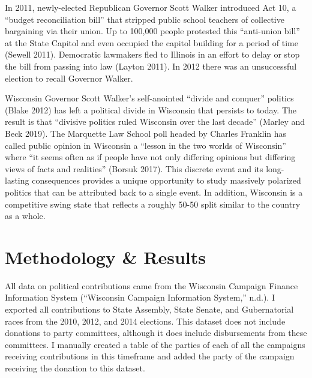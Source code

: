 \documentclass[12pt,]{article}
\begin{document}
In 2011, newly-elected Republican Governor Scott Walker introduced Act
10, a ``budget reconciliation bill'' that stripped public school
teachers of collective bargaining via their union. Up to 100,000 people
protested this ``anti-union bill'' at the State Capitol and even
occupied the capitol building for a period of time (Sewell 2011).
Democratic lawmakers fled to Illinois in an effort to delay or stop the
bill from passing into law (Layton 2011). In 2012 there was an
unsuccessful election to recall Governor Walker.

Wisconsin Governor Scott Walker's self-anointed ``divide and conquer''
politics (Blake 2012) has left a political divide in Wisconsin that
persists to today. The result is that ``divisive politics ruled
Wisconsin over the last decade'' (Marley and Beck 2019). The Marquette
Law School poll headed by Charles Franklin has called public opinion in
Wisconsin a ``lesson in the two worlds of Wisconsin'' where ``it seems
often as if people have not only differing opinions but differing views
of facts and realities'' (Borsuk 2017). This discrete event and its
long-lasting consequences provides a unique opportunity to study
massively polarized politics that can be attributed back to a single
event. In addition, Wisconsin is a competitive swing state that reflects
a roughly 50-50 split similar to the country as a whole.

\hypertarget{methodology-results}{%
\section{Methodology \& Results}\label{methodology-results}}

All data on political contributions came from the Wisconsin Campaign
Finance Information System (``Wisconsin Campaign Information System,''
n.d.). I exported all contributions to State Assembly, State Senate, and
Gubernatorial races from the 2010, 2012, and 2014 elections. This
dataset does not include donations to party committees, although it does
include disbursements from these committees. I manually created a table
of the parties of each of all the campaigns receiving contributions in
this timeframe and added the party of the campaign receiving the
donation to this dataset.
\end{document}
